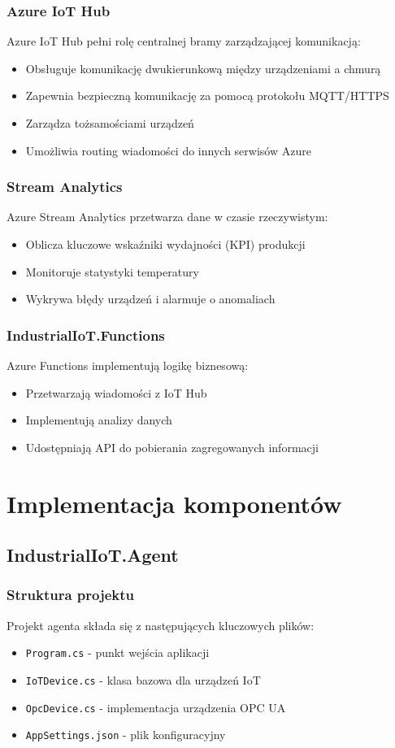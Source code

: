 \documentclass{article}
\begin{document}
\subsubsection{Azure IoT Hub}
Azure IoT Hub pełni rolę centralnej bramy zarządzającej komunikacją:
\begin{itemize}
    \item Obsługuje komunikację dwukierunkową między urządzeniami a chmurą
    \item Zapewnia bezpieczną komunikację za pomocą protokołu MQTT/HTTPS
    \item Zarządza tożsamościami urządzeń
    \item Umożliwia routing wiadomości do innych serwisów Azure
\end{itemize}

\subsubsection{Stream Analytics}
Azure Stream Analytics przetwarza dane w czasie rzeczywistym:
\begin{itemize}
    \item Oblicza kluczowe wskaźniki wydajności (KPI) produkcji
    \item Monitoruje statystyki temperatury
    \item Wykrywa błędy urządzeń i alarmuje o anomaliach
\end{itemize}

\subsubsection{IndustrialIoT.Functions}
Azure Functions implementują logikę biznesową:
\begin{itemize}
    \item Przetwarzają wiadomości z IoT Hub
    \item Implementują analizy danych
    \item Udostępniają API do pobierania zagregowanych informacji
\end{itemize}

\section{Implementacja komponentów}
\subsection{IndustrialIoT.Agent}
\subsubsection{Struktura projektu}
Projekt agenta składa się z następujących kluczowych plików:
\begin{itemize}
    \item \texttt{Program.cs} - punkt wejścia aplikacji
    \item \texttt{IoTDevice.cs} - klasa bazowa dla urządzeń IoT
    \item \texttt{OpcDevice.cs} - implementacja urządzenia OPC UA
    \item \texttt{AppSettings.json} - plik konfiguracyjny
\end{itemize}
\end{document}
